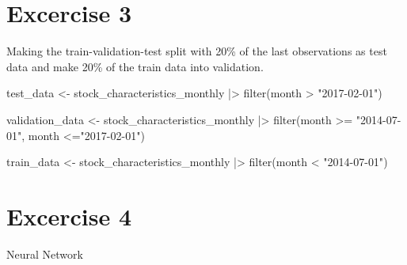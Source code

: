 \documentclass[
]{article}
\newenvironment{Shaded}{\begin{snugshade}}{\end{snugshade}}
\newcommand{\FunctionTok}[1]{\textcolor[rgb]{0.00,0.00,0.00}{#1}}
\newcommand{\NormalTok}[1]{#1}
\newcommand{\OtherTok}[1]{\textcolor[rgb]{0.56,0.35,0.01}{#1}}
\newcommand{\SpecialCharTok}[1]{\textcolor[rgb]{0.00,0.00,0.00}{#1}}
\newcommand{\StringTok}[1]{\textcolor[rgb]{0.31,0.60,0.02}{#1}}
\begin{document}
\hypertarget{excercise-3}{%
\section{Excercise 3}\label{excercise-3}}

Making the train-validation-test split with 20\% of the last
observations as test data and make 20\% of the train data into
validation.

\begin{Shaded}
\begin{Highlighting}[]
\NormalTok{test\_data }\OtherTok{\textless{}{-}}\NormalTok{ stock\_characteristics\_monthly }\SpecialCharTok{|\textgreater{}}
  \FunctionTok{filter}\NormalTok{(month }\SpecialCharTok{\textgreater{}} \StringTok{"2017{-}02{-}01"}\NormalTok{) }
  

\NormalTok{validation\_data }\OtherTok{\textless{}{-}}\NormalTok{ stock\_characteristics\_monthly }\SpecialCharTok{|\textgreater{}}
  \FunctionTok{filter}\NormalTok{(month }\SpecialCharTok{\textgreater{}=} \StringTok{"2014{-}07{-}01"}\NormalTok{, month }\SpecialCharTok{\textless{}=}\StringTok{"2017{-}02{-}01"}\NormalTok{)}

\NormalTok{train\_data }\OtherTok{\textless{}{-}}\NormalTok{ stock\_characteristics\_monthly }\SpecialCharTok{|\textgreater{}}
  \FunctionTok{filter}\NormalTok{(month }\SpecialCharTok{\textless{}} \StringTok{"2014{-}07{-}01"}\NormalTok{)}
\end{Highlighting}
\end{Shaded}

\hypertarget{excercise-4}{%
\section{Excercise 4}\label{excercise-4}}

Neural Network
\end{document}
